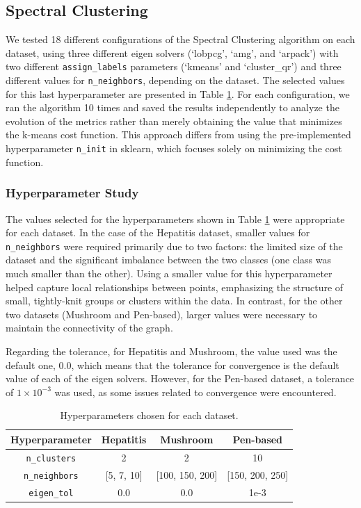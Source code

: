 \subsection{Spectral Clustering}
We tested 18 different configurations of the Spectral Clustering algorithm on each dataset, using three different eigen 
solvers (`lobpcg', `amg', and `arpack') with two different \texttt{assign\_labels} parameters (`kmeans' and `cluster\_qr') 
and three different values for \texttt{n\_neighbors}, depending on the dataset. The selected values for this last hyperparameter
 are presented in Table \ref{tab:hyper-choices-spectral}. For each configuration, we ran the algorithm 10 times and saved the 
 results independently to analyze the evolution of the metrics rather than merely obtaining the value that minimizes the k-means 
 cost function. This approach differs from using the pre-implemented hyperparameter \texttt{n\_init} in sklearn, which focuses 
 solely on minimizing the cost function.

\subsubsection{Hyperparameter Study}

The values selected for the hyperparameters shown in Table \ref{tab:hyper-choices-spectral} were appropriate for each dataset. 
In the case of the Hepatitis dataset, smaller values for \texttt{n\_neighbors} were required primarily due to two factors: the 
limited size of the dataset and the significant imbalance between the two classes (one class was much smaller than the other). 
Using a smaller value for this hyperparameter helped capture local relationships between points, emphasizing the structure of 
small, tightly-knit groups or clusters within the data. In contrast, for the other two datasets (Mushroom and Pen-based),
 larger values were necessary to maintain the connectivity of the graph.



 Regarding the tolerance, for Hepatitis and Mushroom, the value used was the default one, 0.0, which means that the tolerance 
 for convergence is the default value of each of the eigen solvers. However, for the Pen-based dataset, a tolerance of 
 \( 1 \times 10^{-3} \) was used, as some issues related to convergence were encountered.


\begin{table}[h!]
    \centering
    \begin{tabular}{|c|c|c|c|}
    \hline
    \textbf{Hyperparameter}     & \textbf{Hepatitis} & \textbf{Mushroom} & \textbf{Pen-based} \\ \hline
    \texttt{n\_clusters}        &  2      &   2    &  10         \\ \hline
    \texttt{n\_neighbors}       &  [5, 7, 10]  &   [100, 150, 200]  &  [150, 200, 250]   \\ \hline
	\texttt{eigen\_tol}        &  0.0     &   0.0    &  1e-3    \\ \hline
    \end{tabular}
	\caption{Hyperparameters chosen for each dataset.}\label{tab:hyper-choices-spectral}
    \end{table}



